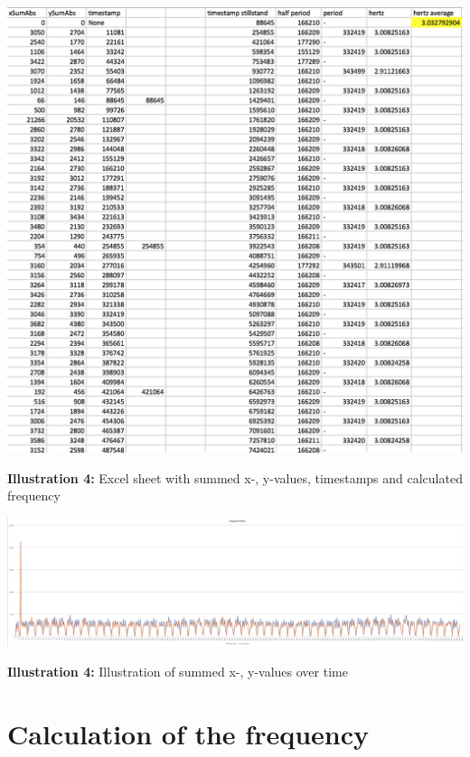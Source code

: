 \documentclass[12pt, a4paper]{report}
\begin{document}
\noindent
\begin{center}
\includegraphics[scale=0.4]{Images/excel_sheet_numbers.png}

{\bf Illustration 4:}  Excel sheet with summed x-, y-values, timestamps and calculated frequency\end{center}

\bigskip

\noindent
\begin{center}
\includegraphics[scale=0.3]{Images/excel_sheet_graph.png}

{\bf Illustration 4:} Illustration of summed x-, y-values over time\end{center}

\bigskip
 
\chapter{Calculation of the frequency}
\end{document}
